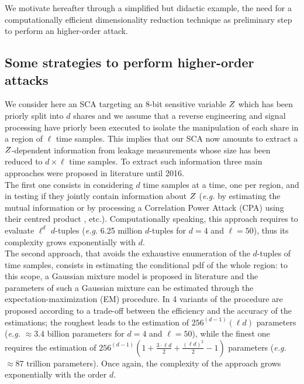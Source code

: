 We motivate hereafter through a simplified but didactic  example, the need for a computationally efficient dimensionality reduction technique as preliminary step to perform an higher-order attack.


\subsection{Some strategies to perform higher-order attacks}\label{sec:example}
We consider here an SCA targeting an $8$-bit sensitive variable $Z$ which has been priorly split into $d$ shares and we assume that a reverse engineering and signal processing have priorly been executed to isolate the manipulation of each share  in a region of $\ell$ time samples. This implies that our SCA  now amounts to extract a $Z$-dependent information from leakage measurements whose size has been reduced to $d\times \ell$ time samples. To extract such information three main approaches were proposed in literature until 2016.\\

The first one consists in considering $d$ time samples  at a time, one per region, and in testing if they jointly contain information about $Z$ (\emph{e.g.} by estimating the mutual information  \cite{Reparaz2012} or by processing a Correlation Power Attack (CPA) using their centred product \cite{chari1999towards}, etc.). Computationally speaking, this approach requires to evaluate $\ell^d$ $d$-tuples (\emph{e.g.} 6.25 million $d$-tuples for $d=4$ and $\ell=50$), thus its complexity grows exponentially with $d$. \\

The second approach, that avoids the exhaustive enumeration of the $d$-tuples of time samples, consists in estimating the conditional pdf of the whole region: 
to this scope, a Gaussian mixture model is proposed in literature \cite{lemke2007gaussian,Lomne2014} and the parameters of such a Gaussian mixture can be estimated through the expectation-maximization (EM) procedure. In \cite{lemke2007gaussian} 4 variants of the procedure are proposed according to a trade-off between the efficiency and the accuracy of the estimations;  the roughest leads to the estimation of  $256^{(d-1)}(\ell d)$  parameters (\emph{e.g.} $\approx 3.4 $ billion parameters for $d=4$ and $\ell=50$), while the finest one requires the estimation of $256^{(d-1)}(1 + \frac{3\cdot \ell d}{2} + \frac{(\ell d)^2}{2}-1)$ parameters (\emph{e.g.} $\approx 87$ trillion parameters). Once again, the complexity of the approach grows exponentially with the order $d$.\\

